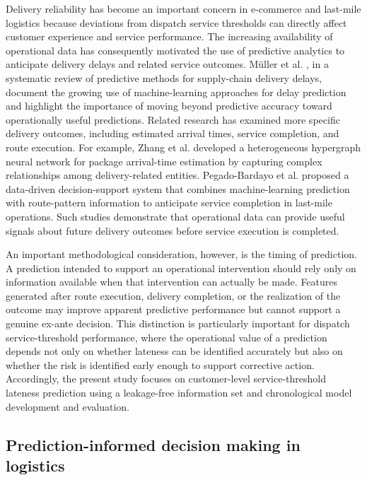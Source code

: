 \documentclass[11pt,a4paper]{article}
\begin{document}
Delivery reliability has become an important concern in e-commerce and
last-mile logistics because deviations from dispatch service thresholds can
directly affect customer experience and service performance. The
increasing availability of operational data has consequently motivated
the use of predictive analytics to anticipate delivery delays and
related service outcomes. Müller et al. \cite{muller2025}, in a systematic review
of predictive methods for supply-chain delivery delays, document the
growing use of machine-learning approaches for delay prediction and
highlight the importance of moving beyond predictive accuracy toward
operationally useful predictions. Related research has examined more
specific delivery outcomes, including estimated arrival times, service
completion, and route execution. For example, Zhang et al. \cite{zhang2024}
developed a heterogeneous hypergraph neural network for package
arrival-time estimation by capturing complex relationships among
delivery-related entities. Pegado-Bardayo et al. \cite{pegado2023} proposed a
data-driven decision-support system that combines machine-learning
prediction with route-pattern information to anticipate service
completion in last-mile operations. Such studies demonstrate that
operational data can provide useful signals about future delivery
outcomes before service execution is completed.

An important methodological consideration, however, is the timing of
prediction. A prediction intended to support an operational intervention
should rely only on information available when that intervention can
actually be made. Features generated after route execution, delivery
completion, or the realization of the outcome may improve apparent
predictive performance but cannot support a genuine ex-ante decision.
This distinction is particularly important for dispatch service-threshold
performance, where the operational value of a prediction depends not
only on whether lateness can be identified accurately but also on
whether the risk is identified early enough to support corrective
action. Accordingly, the present study focuses on customer-level
service-threshold lateness prediction using a leakage-free information set
and chronological model development and evaluation.

\subsection{Prediction-informed decision making in logistics}\label{sec:lit-decision-making}
\end{document}
